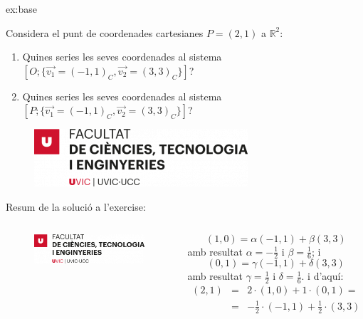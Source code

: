 \documentclass{beamer}
\begin{document}
\begin{frame}

  \begin{exercise}{ex:base}{}

    Considera el punt de coordenades cartesianes $P=(2,1)$ a $\mathbb{R}^2$:
    \begin{enumerate}
      \item Quines series les seves coordenades al sistema
      $[O;\{\overrightarrow{v_1}=(-1,1)_C,\overrightarrow{v_2}=(3,3)_C\}]$?
      \item Quines series les seves coordenades al sistema
      $[P;\{\overrightarrow{v_1}=(-1,1)_C,\overrightarrow{v_2}=(3,3)_C\}]$?
    \end{enumerate}
    \begin{figure}
    \includegraphics[width=0.5\linewidth]{FCTE}
    \end{figure}
  \end{exercise}
\end{frame}
\begin{frame}
Resum de la solució a l'exercise:
\begin{columns}[c] %


\begin{figure}
\includegraphics[width=\linewidth]{FCTE}
\end{figure}
\begin{equation*}
(1,0)=\alpha(-1,1)+\beta(3,3)
\end{equation*}
amb resultat $\alpha=-\frac{1}{2}$ i $\beta=\frac{1}{6}$; i
\begin{equation*}
(0,1)=\gamma(-1,1)+\delta(3,3)
\end{equation*}
amb resultat $\gamma=\frac{1}{2}$ i $\delta=\frac{1}{6}$. i d'aquí:
\begin{eqnarray*}
(2,1)&=&2\cdot(1,0)+1\cdot(0,1)=\\
&=&-\frac{1}{2}\cdot(-1,1)+\frac{1}{2}\cdot(3,3)
\end{eqnarray*}
\end{columns}
\end{frame}
\end{document}
